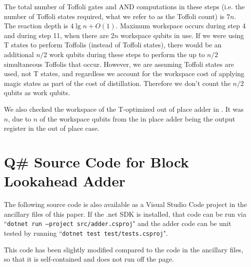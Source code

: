 \documentclass[onecolumn,unpublished]{quantumarticle}
\theoremstyle{definition}
\theoremstyle{definition}
\theoremstyle{definition}
\begin{document}
The total number of Toffoli gates and AND computations in these steps (i.e. the number of Toffoli states required, what we refer to as the Toffoli count) is $7n$.
The reaction depth is $4 \lg n + O(1)$.
Maximum workspace occurs during step 4 and during step 11, when there are $2n$ workspace qubits in use.
If we were using T states to perform Toffolis (instead of Toffoli states), there would be an additional $n/2$ work qubits during these steps to perform the up to $n/2$ simultaneous Toffolis that occur.
However, we are assuming Toffoli states are used, not T states, and regardless we account for the workspace cost of applying magic states as part of the cost of distillation.
Therefore we don't count the $n/2$ qubits as work qubits.

We also checked the workspace of the T-optimized out of place adder in \cite{thapliyal2020lookahead}.
It was $n$, due to $n$ of the workspace qubits from the in place adder being the output register in the out of place case.

\section{Q\# Source Code for Block Lookahead Adder}
\label{app:blockadder}

The following source code is also available as a Visual Studio Code project in the ancillary files of this paper.
If the .net SDK is installed, that code can be run via ``\texttt{dotnet run --project src/adder.csproj}" and the adder code can be unit tested by running ``\texttt{dotnet test test/tests.csproj}".

This code has been slightly modified compared to the code in the ancillary files, so that it is self-contained and does not run off the page.
\end{document}
